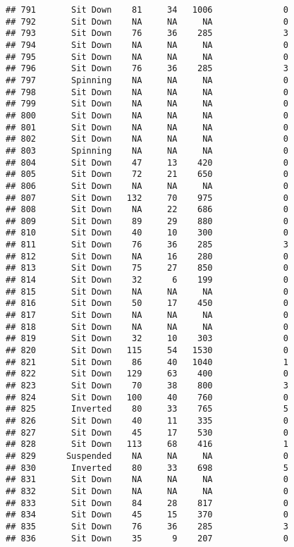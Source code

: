 \documentclass[
]{article}
\begin{document}
\begin{verbatim}
## 791       Sit Down    81     34   1006              0
## 792       Sit Down    NA     NA     NA              0
## 793       Sit Down    76     36    285              3
## 794       Sit Down    NA     NA     NA              0
## 795       Sit Down    NA     NA     NA              0
## 796       Sit Down    76     36    285              3
## 797       Spinning    NA     NA     NA              0
## 798       Sit Down    NA     NA     NA              0
## 799       Sit Down    NA     NA     NA              0
## 800       Sit Down    NA     NA     NA              0
## 801       Sit Down    NA     NA     NA              0
## 802       Sit Down    NA     NA     NA              0
## 803       Spinning    NA     NA     NA              0
## 804       Sit Down    47     13    420              0
## 805       Sit Down    72     21    650              0
## 806       Sit Down    NA     NA     NA              0
## 807       Sit Down   132     70    975              0
## 808       Sit Down    NA     22    686              0
## 809       Sit Down    89     29    880              0
## 810       Sit Down    40     10    300              0
## 811       Sit Down    76     36    285              3
## 812       Sit Down    NA     16    280              0
## 813       Sit Down    75     27    850              0
## 814       Sit Down    32      6    199              0
## 815       Sit Down    NA     NA     NA              0
## 816       Sit Down    50     17    450              0
## 817       Sit Down    NA     NA     NA              0
## 818       Sit Down    NA     NA     NA              0
## 819       Sit Down    32     10    303              0
## 820       Sit Down   115     54   1530              0
## 821       Sit Down    86     40   1040              1
## 822       Sit Down   129     63    400              0
## 823       Sit Down    70     38    800              3
## 824       Sit Down   100     40    760              0
## 825       Inverted    80     33    765              5
## 826       Sit Down    40     11    335              0
## 827       Sit Down    45     17    530              0
## 828       Sit Down   113     68    416              1
## 829      Suspended    NA     NA     NA              0
## 830       Inverted    80     33    698              5
## 831       Sit Down    NA     NA     NA              0
## 832       Sit Down    NA     NA     NA              0
## 833       Sit Down    84     28    817              0
## 834       Sit Down    45     15    370              0
## 835       Sit Down    76     36    285              3
## 836       Sit Down    35      9    207              0

\end{verbatim}
\end{document}
